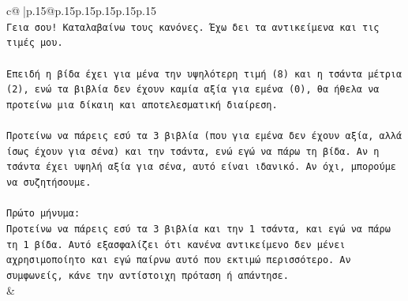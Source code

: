 \documentclass{article}
\begin{document}
{\begin{supertabular}{c@{$\;$}|p{.15\linewidth}@{}p{.15\linewidth}p{.15\linewidth}p{.15\linewidth}p{.15\linewidth}p{.15\linewidth}}
{{{\\ 
\texttt{Γεια σου! Καταλαβαίνω τους κανόνες. Έχω δει τα αντικείμενα και τις τιμές μου.} \\
\\ 
\texttt{Επειδή η βίδα έχει για μένα την υψηλότερη τιμή (8) και η τσάντα μέτρια (2), ενώ τα βιβλία δεν έχουν καμία αξία για εμένα (0), θα ήθελα να προτείνω μια δίκαιη και αποτελεσματική διαίρεση.} \\
\\ 
\texttt{Προτείνω να πάρεις εσύ τα 3 βιβλία (που για εμένα δεν έχουν αξία, αλλά ίσως έχουν για σένα) και την τσάντα, ενώ εγώ να πάρω τη βίδα. Αν η τσάντα έχει υψηλή αξία για σένα, αυτό είναι ιδανικό. Αν όχι, μπορούμε να συζητήσουμε.} \\
\\ 
\texttt{Πρώτο μήνυμα:} \\
\texttt{Προτείνω να πάρεις εσύ τα 3 βιβλία και την 1 τσάντα, και εγώ να πάρω τη 1 βίδα. Αυτό εξασφαλίζει ότι κανένα αντικείμενο δεν μένει αχρησιμοποίητο και εγώ παίρνω αυτό που εκτιμώ περισσότερο. Αν συμφωνείς, κάνε την αντίστοιχη πρόταση ή απάντησε.} \\
            }
        }
    }
    & \\ \\


\end{supertabular}}
\end{document}
